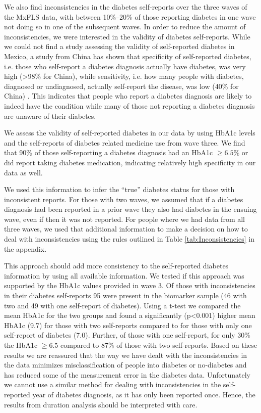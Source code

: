 We also find inconsistencies in the diabetes self-reports over the three waves of the \ac{MxFLS} data, with between 10\%--20\% of those reporting diabetes in one wave not doing so in one of the subsequent waves. In order to reduce the amount of inconsistencies, we were interested in the validity of diabetes self-reports. While we could not find a study assessing the validity of self-reported diabetes in Mexico, a study from China has shown that specificity of self-reported diabetes, i.e. those who self-report a diabetes diagnosis actually have diabetes, was very high (>98\% for China), while sensitivity, i.e. how many people with diabetes, diagnosed or undiagnosed, actually self-report the disease, was low (40\% for China) \parencite{Yuan2015}. This indicates that people who report a diabetes diagnosis are likely to indeed have the condition while many of those not reporting a diabetes diagnosis are unaware of their diabetes.

We assess the validity of self-reported diabetes in our data by using \ac{HbA1c} levels and the self-reports of diabetes related medicine use from wave three. We find that 90\% of those self-reporting a diabetes diagnosis had an \ac{HbA1c} $\geq6.5$\% or did report taking diabetes medication, indicating relatively high specificity in our data as well.

We used this information to infer the ``true'' diabetes status for those with inconsistent reports. For those with two waves, we assumed that if a diabetes diagnosis had been reported in a prior wave they also had diabetes in the ensuing wave, even if then it was not reported.
For people where we had data from all three waves, we used that additional information to make a decision on how to deal with inconsistencies using the rules outlined in Table \ref{tab:Inconsistencies} in the appendix.


This approach should add more consistency to the self-reported diabetes information by using all available information. We tested if this approach was supported by the \ac{HbA1c} values provided in wave 3. Of those with inconsistencies in their diabetes self-reports 95 were present in the biomarker sample (46 with two and 49 with one self-report of diabetes). Using a t-test we compared the mean \ac{HbA1c} for the two groups and found a significantly (p<0.001) higher mean \ac{HbA1c} (9.7) for those with two self-reports compared to for those with only one self-report of diabetes (7.0). Further, of those with one self-report, for only 30\% the \ac{HbA1c} $\geq 6.5$ compared to 87\% of those with two self-reports. Based on these results we are reassured that the way we have dealt with the inconsistencies in the data minimizes misclassification of people into diabetes or no-diabetes and has reduced some of the measurement error in the diabetes data. Unfortunately we cannot use a similar method for dealing with inconsistencies in the self-reported year of diabetes diagnosis, as it has only been reported once. Hence, the results from duration analysis should be interpreted with care.


